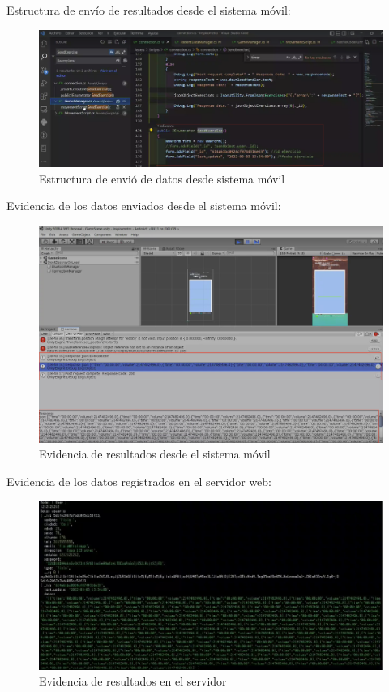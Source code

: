 \documentclass[12pt]{article}
\begin{document}
Estructura de envío de resultados desde el sistema móvil:

\begin{figure}[ht]
\centering
\includegraphics[scale=0.3]{imag/TESTMobileenviodatos.png}
\caption{Estructura de envió de datos desde sistema móvil }
\label{6}
\end{figure}
\FloatBarrier


Evidencia de los datos enviados desde el sistema móvil:

\begin{figure}[ht]
\centering
\includegraphics[scale=0.3]{imag/TESTmovildatosevidenciados.png}
\caption{Evidencia de resultados desde el sistema móvil }
\label{6}
\end{figure}
\FloatBarrier

Evidencia de los datos registrados en el servidor web:
\begin{figure}[ht]
\centering
\includegraphics[scale=0.3]{imag/TESTmobileconsoleresults.png}
\caption{Evidencia de resultados en el servidor }
\label{6}
\end{figure}
\FloatBarrier
\end{document}
